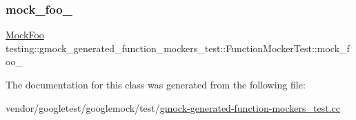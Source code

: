 \subsubsection{\texorpdfstring{mock\+\_\+foo\+\_\+}{mock\_foo\_}}
{\footnotesize\ttfamily \hyperlink{classtesting_1_1gmock__generated__function__mockers__test_1_1_mock_foo}{Mock\+Foo} testing\+::gmock\+\_\+generated\+\_\+function\+\_\+mockers\+\_\+test\+::\+Function\+Mocker\+Test\+::mock\+\_\+foo\+\_\+\hspace{0.3cm}{\ttfamily [protected]}}



The documentation for this class was generated from the following file\+:\begin{DoxyCompactItemize}
\item 
vendor/googletest/googlemock/test/\hyperlink{gmock-generated-function-mockers__test_8cc}{gmock-\/generated-\/function-\/mockers\+\_\+test.\+cc}\end{DoxyCompactItemize}
